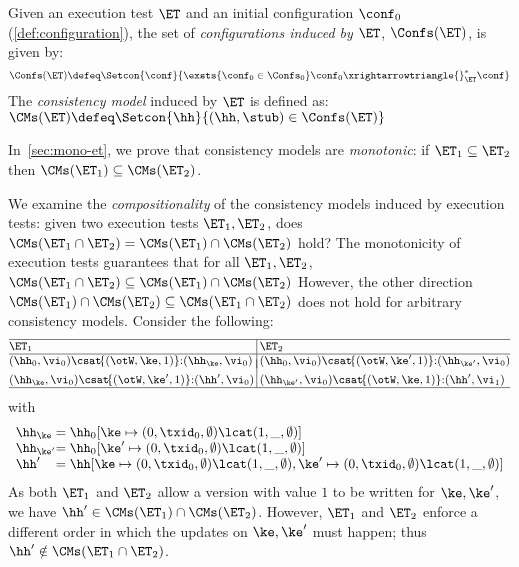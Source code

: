 \begin{definition}
\label{def:cm}
Given an execution test $\ET$ and an initial configuration $\conf_0$ (\cref{def:configuration}),
the set of \emph{configurations induced by $\ET$},  $\Confs(\ET)$, is   given by: 
\[
\Confs(\ET)\defeq 
\Setcon{ \conf}{ 
	\exsts{\conf_0 \in \Confs_0}
	\conf_0 \xrightarrowtriangle{}_{\ET}^{*} \conf
}
\]
The \emph{consistency model} induced by $\ET$ is defined as:
\( 
\CMs(\ET) \defeq \Setcon{ \hh }{ (\hh, \stub) \in \Confs(\ET) }
\)
\end{definition}


\noindent In~\cref{sec:mono-et}, we prove that consistency models are 
\emph{monotonic}: 
if  $\ET_1 \subseteq \ET_2$ then $\CMs(\ET_1) \subseteq \CMs(\ET_2)$.

We examine the \emph{compositionality} of the consistency models induced by execution tests:  
\ie given two execution tests $\ET_1, \ET_2$, does 
$\CMs(\ET_1 \cap \ET_2) = \CMs(\ET_1) \cap \CMs(\ET_2)$ hold? 
The monotonicity of execution tests guarantees that 
 for all $\ET_1, \ET_2$, \( \CMs(\ET_1 \cap \ET_2) \subseteq \CMs(\ET_1) \cap \CMs(\ET_2) \) 
However, the other direction \( \CMs(\ET_1) \cap \CMs(\ET_2) \subseteq \CMs(\ET_1 \cap \ET_2) \) does not hold for arbitrary consistency models.
Consider the following:
\[
\small
\begin{array}{@{}l @{\hspace{2pt}} | @{\hspace{2pt}} l@{}}
    \hline
    \ET_1 & \ET_2 \\
%    
    \hline
    (\hh_{0}, \vi_{0}) \csat\! \{(\otW, \ke, 1)\} {:} ( \hh_{\ke}, \vi_{0})
    &
    (\hh_{0}, \vi_{0}) \csat\! \{(\otW, \ke', 1)\} {:} ( \hh_{\ke'}, \vi_{0}) 
    \vspace*{-7pt}\\\\
    (\hh_{\ke}, \vi_{0}) \csat  \!\{(\otW, \ke', 1)\} {:} (\hh',\vi_{0}) 
    &
    (\hh_{\ke'}, \vi_{0}) \csat \!\{(\otW, \ke, 1)\} {:} (\hh',\vi_{1}) 
    \\
\hline
\end{array}
\]
with 
\[
    \begin{array}{l@{} l}
    \hh_{\ke} & = \hh_{0}[\ke \mapsto (0, \txid_{0}, \emptyset) \lcat (1, \_, \emptyset)] \\
    \hh_{\ke'} & = \hh_{0}[\ke' \mapsto (0, \txid_{0}, \emptyset) \lcat (1, \_, \emptyset)] \\
    \hh' & = \hh[\ke \mapsto (0, \txid_{0}, \emptyset) \lcat (1, \_, \emptyset) 
                ,\ke' \mapsto (0, \txid_{0}, \emptyset) \lcat (1, \_, \emptyset)] \\
\end{array}
\]
As both $\ET_1$ and $\ET_2$ allow a version with value $1$ to be written for 
$\ke, \ke'$,  we have $\hh' \in \CMs(\ET_1) \cap \CMs(\ET_2)$. 
However, $\ET_1$ and $\ET_2$ enforce a different order in which the updates on $\ke, \ke'$ must happen; 
thus $\hh' \notin \CMs(\ET_1 \cap \ET_2)$. 

